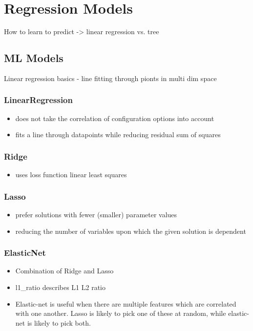 


\section{Regression Models}
\label{lin_reg}

How to learn to predict -> linear regression vs. tree

\subsection{ML Models}
Linear regression basics - line fitting through pionts in multi dim space

\subsubsection{LinearRegression}
\begin{itemize}
	\item does not take the correlation of configuration options into account
	\item fits a line through datapoints while reducing residual sum of squares
\end{itemize}
\subsubsection{Ridge}
\begin{itemize}
	\item uses loss function linear least squares
\end{itemize}
\subsubsection{Lasso}
\begin{itemize}
	\item prefer solutions with fewer (smaller) parameter values
	\item reducing the number of variables upon which the given solution is dependent
\end{itemize}
\subsubsection{ElasticNet}
\begin{itemize}
	\item Combination of Ridge and Lasso
	\item l1\_ratio describes L1 L2 ratio
	\item Elastic-net is useful when there are multiple features which are correlated with one another. Lasso is likely to pick one of these at random, while elastic-net is likely to pick both.
\end{itemize}
